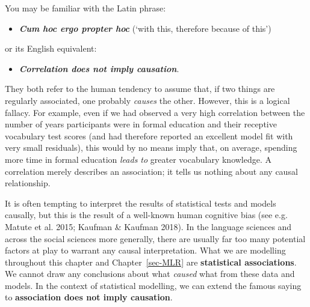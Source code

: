 \documentclass[
  letterpaper,
  DIV=11,
  numbers=noendperiod]{scrreprt}
\providecommand{\tightlist}{%
  \setlength{\itemsep}{0pt}\setlength{\parskip}{0pt}}
\newcounter{quartocalloutnteno}
\newcommand{\quartocalloutnte}[1]{\refstepcounter{quartocalloutnteno}\label{#1}}
\begin{document}
\begin{tcolorbox}[enhanced jigsaw, arc=.35mm, bottomrule=.15mm, bottomtitle=1mm, breakable, colback=white, colbacktitle=quarto-callout-important-color!10!white, colframe=quarto-callout-important-color-frame, coltitle=black, left=2mm, leftrule=.75mm, opacityback=0, opacitybacktitle=0.6, rightrule=.15mm, title=\textcolor{quarto-callout-important-color}{\faExclamation}\hspace{0.5em}{Important \ref*{nte-Causation}: Association does not imply causation!}, titlerule=0mm, toprule=.15mm, toptitle=1mm]

\quartocalloutnte{nte-Causation} 

You may be familiar with the Latin phrase:

\begin{itemize}
\tightlist
\item
  \textbf{\emph{Cum hoc ergo propter hoc}} (`with this, therefore
  because of this')
\end{itemize}

or its English equivalent:

\begin{itemize}
\tightlist
\item
  \textbf{\emph{Correlation does not imply causation}}.
\end{itemize}

They both refer to the human tendency to assume that, if two things are
regularly associated, one probably \emph{causes} the other. However,
this is a logical fallacy. For example, even if we had observed a very
high correlation between the number of years participants were in formal
education and their receptive vocabulary test scores (and had therefore
reported an excellent model fit with very small residuals), this would
by no means imply that, on average, spending more time in formal
education \emph{leads to} greater vocabulary knowledge. A correlation
merely describes an association; it tells us nothing about any causal
relationship.

It is often tempting to interpret the results of statistical tests and
models causally, but this is the result of a well-known human cognitive
bias (see e.g. Matute et al. 2015; Kaufman \& Kaufman 2018). In the
language sciences and across the social sciences more generally, there
are usually far too many potential factors at play to warrant any causal
interpretation. What we are modelling throughout this chapter and
Chapter~\ref{sec-MLR} are \textbf{statistical associations}. We cannot
draw any conclusions about what \emph{caused} what from these data and
models. In the context of statistical modelling, we can extend the
famous saying to \textbf{association does not imply causation}.


\end{tcolorbox}
\end{document}
